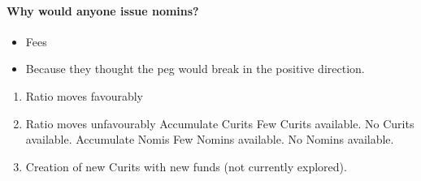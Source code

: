\paragraph{Why would anyone issue nomins?}
\begin{itemize}
	\item Fees
	\item Because they thought the peg would break in the positive direction.
\end{itemize}

\begin{enumerate}
	\item Ratio moves favourably
	\item Ratio moves unfavourably
		\subitem Accumulate Curits
			\subsubitem Few Curits available.
			\subsubitem No Curits available.
		\subitem Accumulate Nomis
			\subsubitem Few Nomins available.
			\subsubitem No Nomins available.
	\item Creation of new Curits with new funds (not currently explored).
\end{enumerate}


\pagebreak